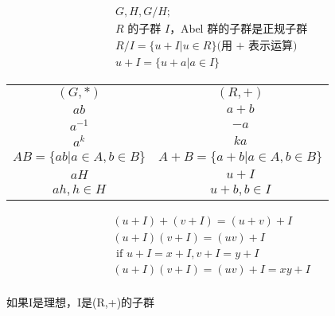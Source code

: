 \documentclass[12pt, a4paper]{article}  %
\begin{document}
\begin{align}
    &G,H,G/H;\\
    &\text{$R$ 的子群 $I$，Abel 群的子群是正规子群}\\
    &R/I=\{u + I|u\in R\}\text{(用 + 表示运算)}\\
    &u + I=\{u + a|a\in I\}
\end{align}
\begin{center}
    \begin{tabular}{|c|c|}
        $(G,*)$&$(R,+)$\\
        $ab$&$a + b$\\
        $a^{-1}$&$-a$\\
        $a^k$&$ka$\\
        $AB=\{ab|a\in A,b\in B\}$ & $A + B=\{a + b|a\in A,b\in B\}$ \\
        $aH$&$u + I$\\
        $ah,h\in H$&$u + b,b\in I$
    \end{tabular}
\end{center}

\begin{align}
    & (u+I)+(v+I)=(u+v)+I\\
    &(u+I)(v+I)=(uv)+I\\
    &\text{ if } u+I=x+I,v+I=y+I\\
    &(u+I)(v+I)=(uv)+I=xy+I\\
\end{align}

如果I是理想，I是(R,+)的子群
\end{document}
